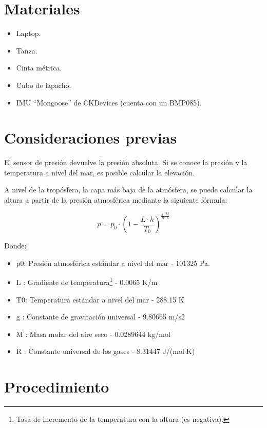 \documentclass[main]{subfiles}
\begin{document}
\newpage
\section{Materiales}
\label{sec:materiales}

\begin{itemize}
\item Laptop.
\item Tanza.
\item Cinta métrica.
\item Cubo de lapacho.
\item IMU ``Mongoose'' de CKDevices (cuenta con un BMP085).
\end{itemize}

\section{Consideraciones previas}
\label{consideraciones}

El sensor de presión devuelve la presión absoluta. Si se conoce la presión y la temperatura a nivel del mar, es posible calcular la elevación.

A nivel de la tropósfera, la capa más baja de la atmósfera, se puede calcular la altura a partir de la presión atmosférica mediante la siguiente fórmula\cite{bib:alt-press}:

\begin{equation}
  \label{eq:press-alt}
  p = p_0 \cdot \left(1 - \frac{L \cdot h}{T_0} \right)^\frac{g \cdot M}{R \cdot L}
\end{equation}

Donde:
\begin{itemize}
\item p0: 	Presión atmosférica estándar a nivel del mar -	101325 Pa.
\item L :	Gradiente de temperatura\footnote{Tasa de incremento de la temperatura con la altura (es negativa).} -	0.0065 K/m
\item T0:	Temperatura estándar a nivel del mar -	288.15 K
\item g :	Constante de gravitación universal -	9.80665 m/s2
\item M :	Masa molar del aire seco -	0.0289644 kg/mol
\item R :	Constante universal de los gases - 	8.31447 J/(mol$\cdot$K)
\end{itemize}


\newpage
\section{Procedimiento}
\label{sec:procedimiento}
\end{document}
